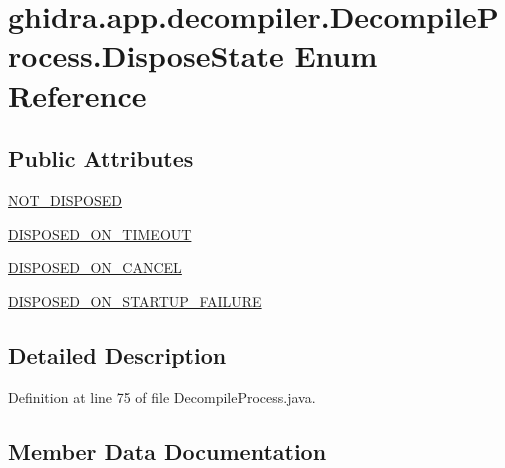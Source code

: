 \hypertarget{enumghidra_1_1app_1_1decompiler_1_1_decompile_process_1_1_dispose_state}{}\section{ghidra.\+app.\+decompiler.\+Decompile\+Process.\+Dispose\+State Enum Reference}
\label{enumghidra_1_1app_1_1decompiler_1_1_decompile_process_1_1_dispose_state}
\subsection*{Public Attributes}
\begin{DoxyCompactItemize}
\item 
\mbox{\hyperlink{enumghidra_1_1app_1_1decompiler_1_1_decompile_process_1_1_dispose_state_aa39c6635250fd783afa5ed6e728310b3}{N\+O\+T\+\_\+\+D\+I\+S\+P\+O\+S\+ED}}
\item 
\mbox{\hyperlink{enumghidra_1_1app_1_1decompiler_1_1_decompile_process_1_1_dispose_state_ae29fdcc87b93aba085b57014d5575e51}{D\+I\+S\+P\+O\+S\+E\+D\+\_\+\+O\+N\+\_\+\+T\+I\+M\+E\+O\+UT}}
\item 
\mbox{\hyperlink{enumghidra_1_1app_1_1decompiler_1_1_decompile_process_1_1_dispose_state_a595db7c765a27658b61dd9a413c737e3}{D\+I\+S\+P\+O\+S\+E\+D\+\_\+\+O\+N\+\_\+\+C\+A\+N\+C\+EL}}
\item 
\mbox{\hyperlink{enumghidra_1_1app_1_1decompiler_1_1_decompile_process_1_1_dispose_state_a02f77483c8f07dc6040035395ebe774b}{D\+I\+S\+P\+O\+S\+E\+D\+\_\+\+O\+N\+\_\+\+S\+T\+A\+R\+T\+U\+P\+\_\+\+F\+A\+I\+L\+U\+RE}}
\end{DoxyCompactItemize}


\subsection{Detailed Description}


Definition at line 75 of file Decompile\+Process.\+java.



\subsection{Member Data Documentation}
\mbox{\label{enumghidra_1_1app_1_1decompiler_1_1_decompile_process_1_1_dispose_state_a595db7c765a27658b61dd9a413c737e3}} 
